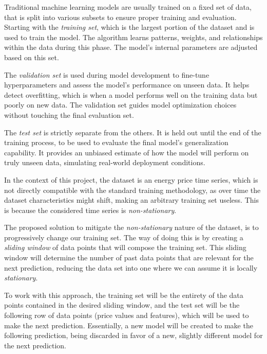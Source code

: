 \documentclass[12pt]{report} %
\begin{document}
Traditional machine learning models are usually trained on a fixed set of data, that is split into various subsets to ensure proper training and evaluation. Starting with the \textit{training set}, which is the largest portion of the dataset and is used to train the model. The algorithm learns patterns, weights, and relationships within the data during this phase. The model’s internal parameters are adjusted based on this set.

The \textit{validation set} is used during model development to fine-tune hyperparameters and assess the model’s performance on unseen data. It helps detect overfitting, which is when a model performs well on the training data but poorly on new data. The validation set guides model optimization choices without touching the final evaluation set.

The \textit{test set} is strictly separate from the others. It is held out until the end of the training process, to be used to evaluate the final model’s generalization capability. It provides an unbiased estimate of how the model will perform on truly unseen data, simulating real-world deployment conditions.

In the context of this project, the dataset is an energy price time series, which is not directly compatible with the standard training methodology, as over time the dataset characteristics might shift, making an arbitrary training set useless. This is because the considered time series is \textit{non-stationary}.

The proposed solution to mitigate the \textit{non-stationary} nature of the dataset, is to progressively change our training set. The way of doing this is by creating a \textit{sliding window} of data points that will compose the training set. This sliding window will determine the number of past data points that are relevant for the next prediction, reducing the data set into one where we can assume it is locally \textit{stationary}.

To work with this approach, the training set will be the entirety of the data points contained in the desired sliding window, and the test set will be the following row of data points (price values and features), which will be used to make the next prediction. Essentially, a new model will be created to make the following prediction, being discarded in favor of a new, slightly different model for the next prediction.
\end{document}
